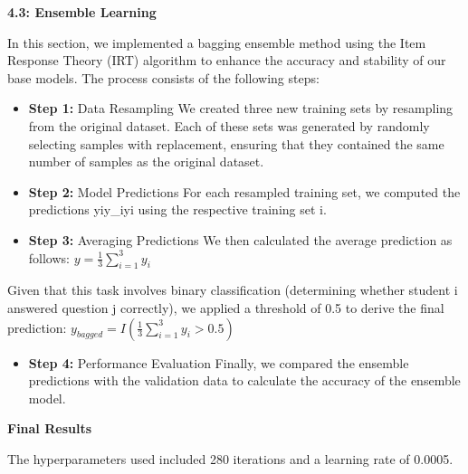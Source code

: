\documentclass[letterpaper]{article}
\begin{document}
\bigskip


\bigskip

\textbf{4.3: Ensemble Learning}

In this section, we implemented a bagging ensemble method using the Item Response Theory (IRT) algorithm to enhance the
accuracy and stability of our base models. The process consists of the following steps:

\begin{itemize}[resume*=listWWNumii]
\item \textbf{Step 1:} Data Resampling\newline
We created three new training sets by resampling from the original dataset. Each of these sets was generated by randomly
selecting samples with replacement, ensuring that they contained the same number of samples as the original dataset.
\item \textbf{Step 2:} Model Predictions\newline
For each resampled training set, we computed the predictions yiy\_iyi\hspace{0pt} using the respective training set i.
\item \textbf{Step 3:} Averaging Predictions\newline
We then calculated the average prediction as follows:\newline
 $y=\frac 1 3\sum _{i=1}^3y_i$
\end{itemize}
\newline
Given that this task involves binary classification (determining whether student i answered question j correctly), we
applied a threshold of 0.5 to derive the final prediction:\newline
 $y_{\mathit{bagged}}=I\left(\frac 1 3\sum _{i=1}^3y_i>0.5\right)$


\bigskip

\begin{itemize}[resume*=listWWNumii]
\item \textbf{Step 4:} Performance Evaluation\newline
Finally, we compared the ensemble predictions with the validation data to calculate the accuracy of the ensemble model.
\end{itemize}

\bigskip

\textbf{Final Results}

The hyperparameters used included 280 iterations and a learning rate of 0.0005.


\end{document}
